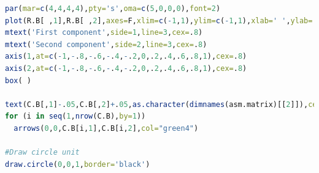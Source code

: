 \documentclass[11pt, a4paper,titlepage]{article}
\begin{document}
\begin{lstlisting}[language=R]
par(mar=c(4,4,4,4),pty='s',oma=c(5,0,0,0),font=2)
plot(R.B[ ,1],R.B[ ,2],axes=F,xlim=c(-1,1),ylim=c(-1,1),xlab=' ',ylab=' ',cex=2.8, pch=".", col="grey")
mtext('First component',side=1,line=3,cex=.8)
mtext('Second component',side=2,line=3,cex=.8)
axis(1,at=c(-1,-.8,-.6,-.4,-.2,0,.2,.4,.6,.8,1),cex=.8)
axis(2,at=c(-1,-.8,-.6,-.4,-.2,0,.2,.4,.6,.8,1),cex=.8)
box( )

text(C.B[,1]-.05,C.B[,2]+.05,as.character(dimnames(asm.matrix)[[2]]),cex=0.7,col="green4")
for (i in seq(1,nrow(C.B),by=1))
  arrows(0,0,C.B[i,1],C.B[i,2],col="green4")

#Draw circle unit
draw.circle(0,0,1,border='black')
\end{lstlisting}



\end{document}
